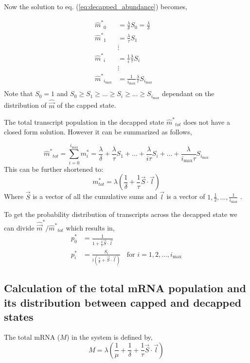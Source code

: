 \documentclass[review]{elsarticle}
\newcommand{\imax}{\ensuremath{{i_{\max}}}\xspace}
\newcommand{\mhat}{\ensuremath{\hat{m}}\xspace}
\newcommand{\mhatstar}{\ensuremath{\mhat^{*}}\xspace}
\newcommand{\mvec}{\ensuremath{\vec{m}}\xspace}
\newcommand{\mvechat}{\ensuremath{\hat{\mvec}}\xspace}
\newcommand{\mvechatstar}{\ensuremath{\mvechat^*}\xspace}
\begin{document}
Now the solution to eq. (\ref{eq:decapped_abundance}) becomes,

\begin{align} \label{eq:decapped_solution} 
\mhatstar_0  &= \frac{\lambda}{\delta}S_{0}=\frac{\lambda}{\delta} \\ \nonumber
\mhatstar_1  &= \frac{\lambda}{\tau}S_{1} \\ \nonumber
& \vdots & \\ \nonumber
\mhatstar_i  &= \frac{1}{i}\frac{\lambda}{\tau}S_{i}  \\ \nonumber
& \vdots & \\ \nonumber
\mhatstar_{\imax}  &= \frac{1}{\imax}\frac{\lambda}{\tau}S_{\imax}  \\ \nonumber
\end{align}
 Note that $S_{0}=1$ and $ S_{0} \ge S_{1} \ge ... \ge S_{i} \ge ... \ge S_{\imax}$ dependant on the distribution of \mvechat of the capped state. %

The total transcript population in the decapped state $\mhatstar_{tot}$ does not have a closed form solution. However it can be summarized as follows,

\begin{equation*}
	\mhatstar_{tot} = \sum_{i=0}^{\imax} m_{i}^{*} = \frac{\lambda}{\delta} + \frac{\lambda}{\tau}S_{1} + \hdots + \frac{\lambda}{i \tau}S_{i} + \hdots  + \frac{\lambda}{\imax \tau}S_{\imax} 
\end{equation*}
This can be further shortened to:
\begin{equation} \label{eq: marked_total_pop}
	m_{tot}^{*} = \lambda(\frac{1}{\delta} + \frac{1}{\tau}\vec{S} \cdot \vec{l}	) 
\end{equation}
Where $\vec{S}$ is a vector of all the cumulative sums and $\vec{l}$ is a vector of $1,\frac{1}{2},...,\frac{1}{\imax}$ . 


To get the probability distribution of transcripts across the decapped state we can divide $\mvechatstar/\mhatstar_{tot}$ which results in,
\begin{align}\label{eq:decapped_distribution}
	p_{0}^{*} &= \frac{1}{1 + \frac{\delta}{\tau}\vec{S} \cdot \vec{l}}	\\
  	p_{i}^{*} &= \frac{S_{i}}{i(\frac{\tau}{\delta} + \vec{S} \cdot \vec{l})}	\:\:\:\: \text{for } i=1, 2, ..., \imax
\end{align}

\subsection{Calculation of the total mRNA population and its distribution between capped and decapped states}
The total mRNA ($M$) in the system is defined by,
\begin{equation}
	M = \lambda(\frac{1}{\mu} +  \frac{1}{\delta} + \frac{1}{\tau}\vec{S} \cdot \vec{l})
\end{equation}
\end{document}
